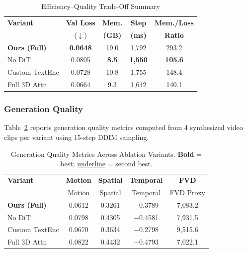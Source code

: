 \documentclass{ieeeaccess}
\begin{document}
\begin{table}[H]
    \centering
    \caption{Efficiency--Quality Trade-Off Summary}
    \label{tab:efficiency_summary}
    \renewcommand{\arraystretch}{1.15}
    \begin{tabular}{@{} l c c c c @{}}
        \toprule
        \rowcolor{tableheader}
        \textbf{Variant} & \textbf{Val Loss} & \textbf{Mem.} & \textbf{Step} & \textbf{Mem./Loss} \\
        \rowcolor{tableheader}
        & ($\downarrow$) & \textbf{(GB)} & \textbf{(ms)} & \textbf{Ratio} \\
        \midrule
        \rowcolor{tablerow1}
        \textbf{Ours (Full)} & \cellcolor{bestcell}\textbf{0.0648} & 19.0 & 1{,}792 & 293.2 \\
        \rowcolor{tablerow2}
        No DiT & 0.0805 & \cellcolor{bestcell}\textbf{8.5} & \cellcolor{bestcell}\textbf{1{,}550} & \cellcolor{bestcell}\textbf{105.6} \\
        \rowcolor{tablerow1}
        Custom TextEnc & 0.0728 & 10.8 & 1{,}755 & 148.4 \\
        \rowcolor{tablerow2}
        Full 3D Attn & 0.0664 & 9.3 & 1{,}642 & 140.1 \\
        \bottomrule
    \end{tabular}
\end{table}

\subsubsection{Generation Quality}

Table~\ref{tab:quality_metrics} reports generation quality metrics computed from 4 synthesized video clips per variant using 15-step DDIM sampling.

\begin{table}[H]
    \centering
    \caption{Generation Quality Metrics Across Ablation Variants. \textbf{Bold} = best; \underline{underline} = second best.}
    \label{tab:quality_metrics}
    \renewcommand{\arraystretch}{1.15}
    \begin{tabular}{@{} l c c c c @{}}
        \toprule
        \rowcolor{tableheader}
        \textbf{Variant} & \textbf{Motion} & \textbf{Spatial} & \textbf{Temporal} & \textbf{FVD} \\
        \rowcolor{tableheader}
        & Motion & Spatial & Temporal & FVD Proxy \\
        \midrule
        \textbf{Ours (Full)} & 0.0612 & 0.3261 & $-$0.3789 & 7,083.2 \\
        No DiT & 0.0798 & 0.4305 & $-$0.4581 & 7,931.5 \\
        Custom TextEnc & 0.0670 & 0.3634 & $-$0.2798 & 9,515.6 \\
        Full 3D Attn & 0.0822 & 0.4432 & $-$0.4793 & 7,022.1 \\
        \bottomrule
    \end{tabular}
\end{table}
\end{document}
